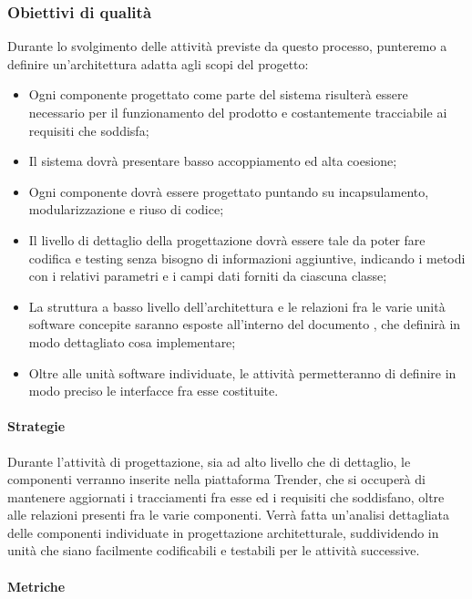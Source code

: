 \documentclass[../NormeDiProgetto.tex]{subfiles}
\begin{document}
      		\subsubsection{Obiettivi di qualità}
			Durante lo svolgimento delle attività previste da questo processo, punteremo a definire un'architettura adatta agli scopi del progetto:
			\begin{itemize}
				\item Ogni componente progettato come parte del sistema risulterà essere necessario per il funzionamento del prodotto e costantemente tracciabile ai requisiti che soddisfa;
				\item Il sistema dovrà presentare basso accoppiamento ed alta coesione;
				\item Ogni componente dovrà essere progettato puntando su incapsulamento, modularizzazione e riuso di codice;
				\item Il livello di dettaglio della progettazione dovrà essere tale da poter fare codifica e testing senza bisogno di informazioni aggiuntive, indicando i metodi con i relativi parametri e i campi dati forniti da ciascuna classe;
				\item La struttura a basso livello dell'architettura e le relazioni fra le varie unità software concepite saranno esposte all'interno del documento , che definirà in modo dettagliato cosa implementare;
				\item Oltre alle unità software individuate, le attività permetteranno di definire in modo preciso le interfacce fra esse costituite.
			\end{itemize}
			
			\paragraph{Strategie}
			Durante l'attività di progettazione, sia ad alto livello che di dettaglio, le componenti verranno inserite nella piattaforma Trender, che si occuperà di mantenere aggiornati i tracciamenti fra esse ed i requisiti che soddisfano, oltre alle relazioni presenti fra le varie componenti. Verrà fatta un'analisi dettagliata delle componenti individuate in progettazione architetturale, suddividendo in unità che siano facilmente codificabili e testabili per le attività successive.
			
			\paragraph{Metriche}\mbox{}\\
\end{document}
